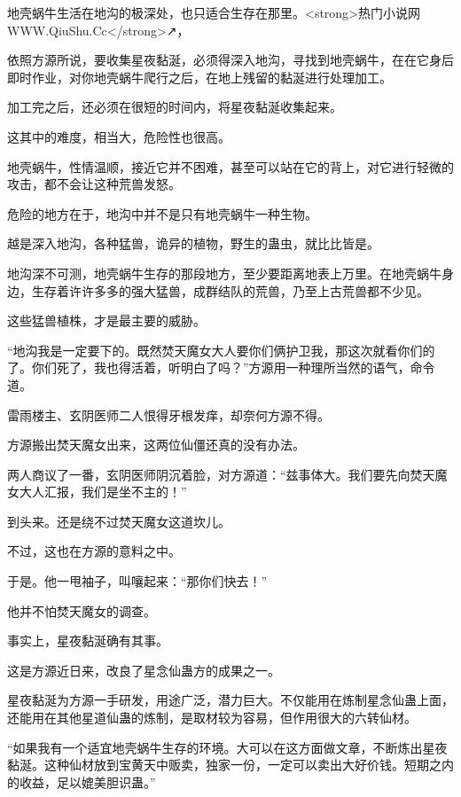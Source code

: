 
\begin{this_body}

地壳蜗牛生活在地沟的极深处，也只适合生存在那里。<strong>热门小说网WWW.QiuShu.Cc</strong>↗，

依照方源所说，要收集星夜黏涎，必须得深入地沟，寻找到地壳蜗牛，在在它身后即时作业，对你地壳蜗牛爬行之后，在地上残留的黏涎进行处理加工。

加工完之后，还必须在很短的时间内，将星夜黏涎收集起来。

这其中的难度，相当大，危险性也很高。

地壳蜗牛，性情温顺，接近它并不困难，甚至可以站在它的背上，对它进行轻微的攻击，都不会让这种荒兽发怒。

危险的地方在于，地沟中并不是只有地壳蜗牛一种生物。

越是深入地沟，各种猛兽，诡异的植物，野生的蛊虫，就比比皆是。

地沟深不可测，地壳蜗牛生存的那段地方，至少要距离地表上万里。在地壳蜗牛身边，生存着许许多多的强大猛兽，成群结队的荒兽，乃至上古荒兽都不少见。

这些猛兽植株，才是最主要的威胁。

“地沟我是一定要下的。既然焚天魔女大人要你们俩护卫我，那这次就看你们的了。你们死了，我也得活着，听明白了吗？”方源用一种理所当然的语气，命令道。

雷雨楼主、玄阴医师二人恨得牙根发痒，却奈何方源不得。

方源搬出焚天魔女出来，这两位仙僵还真的没有办法。

两人商议了一番，玄阴医师阴沉着脸，对方源道：“兹事体大。我们要先向焚天魔女大人汇报，我们是坐不主的！”

到头来。还是绕不过焚天魔女这道坎儿。

不过，这也在方源的意料之中。

于是。他一甩袖子，叫嚷起来：“那你们快去！”

他并不怕焚天魔女的调查。

事实上，星夜黏涎确有其事。

这是方源近日来，改良了星念仙蛊方的成果之一。

星夜黏涎为方源一手研发，用途广泛，潜力巨大。不仅能用在炼制星念仙蛊上面，还能用在其他星道仙蛊的炼制，是取材较为容易，但作用很大的六转仙材。

“如果我有一个适宜地壳蜗牛生存的环境。大可以在这方面做文章，不断炼出星夜黏涎。这种仙材放到宝黄天中贩卖，独家一份，一定可以卖出大好价钱。短期之内的收益，足以媲美胆识蛊。”


\end{this_body}

